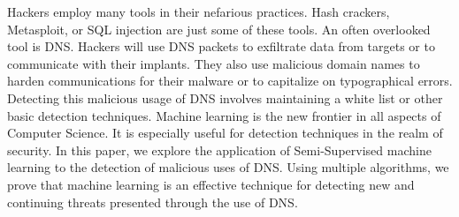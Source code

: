 Hackers employ many tools in their nefarious practices.
Hash crackers, Metasploit, or SQL injection are just some of these tools.
An often overlooked tool is DNS\@.
Hackers will use DNS packets to exfiltrate data from targets or to communicate with their implants.
They also use malicious domain names to harden communications for their malware or to capitalize on typographical errors.
Detecting this malicious usage of DNS involves maintaining a white list or other basic detection techniques.
Machine learning is the new frontier in all aspects of Computer Science.
It is especially useful for detection techniques in the realm of security.
In this paper, we explore the application of Semi-Supervised machine learning to the detection of malicious uses of DNS\@.
Using multiple algorithms, we prove that machine learning is an effective technique for detecting new and continuing threats
presented through the use of DNS\@.
